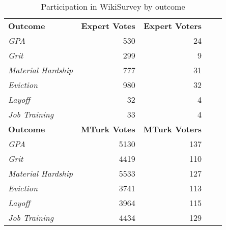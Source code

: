\begin{table}[h]
\centering
\caption{Participation in WikiSurvey by outcome}
\label{wikisurvey}
\begin{tabular}{l|rrrr}
\toprule
\textbf{Outcome}           & \textbf{Expert Votes} & \textbf{Expert Voters} \\
\textit{GPA}               & 530                   & 24                     \\
\textit{Grit}              & 299                   & 9                      \\
\textit{Material Hardship} & 777                   & 31                     \\
\textit{Eviction}          & 980                   & 32                     \\
\textit{Layoff}            & 32                    & 4                      \\
\textit{Job Training}      & 33                    & 4                      \\
\midrule
\textbf{Outcome}           & \textbf{MTurk Votes}  & \textbf{MTurk Voters}  \\
\textit{GPA}               & 5130                  & 137                    \\
\textit{Grit}              & 4419                  & 110                    \\
\textit{Material Hardship} & 5533                  & 127                    \\
\textit{Eviction}          & 3741                  & 113                    \\
\textit{Layoff}            & 3964                  & 115                    \\
\textit{Job Training}      & 4434                  & 129                    \\
\bottomrule
\end{tabular}
\end{table}

